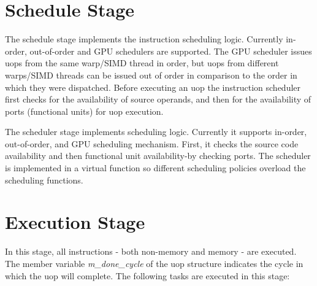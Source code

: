 \section{Schedule Stage}

The schedule stage implements the instruction scheduling logic. Currently
in-order, out-of-order and GPU schedulers are supported. The GPU scheduler
issues uops from the same warp/SIMD thread in order, but uops from different
warps/SIMD threads can be issued out of order in comparison to the order in
which they were dispatched. Before executing an uop the instruction scheduler
first checks for the availability of source operands, and then for the
availability of ports (functional units) for uop execution. 

\ignore
		{ The scheduler stage implements scheduling logic. Currently it supports
		in-order, out-of-order, and GPU scheduling mechanism.  First, it checks the
		source code availability and then functional unit availability-by checking
		ports.  The scheduler is implemented in a virtual function so different
		scheduling policies overload the scheduling functions.}

\section{Execution Stage}

In this stage, all instructions - both non-memory and memory - are executed.
The member variable \textit{m\_done\_cycle} of the uop structure indicates the
cycle in which the uop will complete. The following tasks are executed in this
stage:

